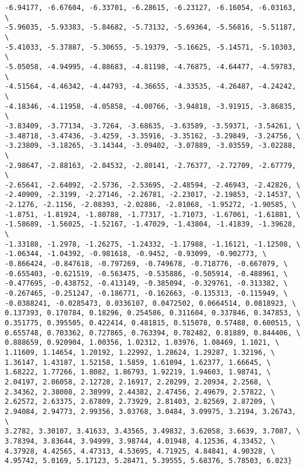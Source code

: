 \documentclass[%
  twocolumn,
 showpacs,
 showkeys,
 preprintnumbers,
 amsmath,amssymb,
 aps,
  pra,
  longbibliography,
 floatfix,
 ]{revtex4-1}
\begin{document}
{\begin{lstlisting}[backgroundcolor=\color{yellow!10},framerule=0pt,breaklines=true, frame=tb]
-6.94177, -6.67604, -6.33701, -6.28615, -6.23127, -6.16054, -6.03163, \
-5.96035, -5.93383, -5.84682, -5.73132, -5.69364, -5.56816, -5.51187, \
-5.41033, -5.37887, -5.30655, -5.19379, -5.16625, -5.14571, -5.10303, \
-5.05058, -4.94995, -4.88683, -4.81198, -4.76875, -4.64477, -4.59783, \
-4.51564, -4.46342, -4.44793, -4.36655, -4.33535, -4.26487, -4.24242, \
-4.18346, -4.11958, -4.05858, -4.00766, -3.94818, -3.91915, -3.86835, \
-3.83409, -3.77134, -3.7264, -3.68635, -3.63589, -3.59371, -3.54261, \
-3.48718, -3.47436, -3.4259, -3.35916, -3.35162, -3.29849, -3.24756, \
-3.23809, -3.18265, -3.14344, -3.09402, -3.07889, -3.03559, -3.02288, \
-2.98647, -2.88163, -2.84532, -2.80141, -2.76377, -2.72709, -2.67779, \
-2.65641, -2.64092, -2.5736, -2.53695, -2.48594, -2.46943, -2.42826, \
-2.40909, -2.3199, -2.27146, -2.26781, -2.23017, -2.19853, -2.14537, \
-2.1276, -2.1156, -2.08393, -2.02886, -2.01068, -1.95272, -1.90585, \
-1.8751, -1.81924, -1.80788, -1.77317, -1.71073, -1.67061, -1.61881, \
-1.58689, -1.56025, -1.52167, -1.47029, -1.43804, -1.41839, -1.39628, \
-1.33188, -1.2978, -1.26275, -1.24332, -1.17988, -1.16121, -1.12508, \
-1.06344, -1.04392, -0.981618, -0.9452, -0.93099, -0.902773, \
-0.866424, -0.847618, -0.797269, -0.749678, -0.718776, -0.667079, \
-0.655403, -0.621519, -0.563475, -0.535886, -0.505914, -0.488961, \
-0.477695, -0.438752, -0.413149, -0.385094, -0.329761, -0.313382, \
-0.267465, -0.251247, -0.186771, -0.162663, -0.135313, -0.115949, \
-0.0388241, -0.0285473, 0.0336107, 0.0472502, 0.0664514, 0.0818923, \
0.137393, 0.170784, 0.18296, 0.254586, 0.311604, 0.337846, 0.347853, \
0.351775, 0.395505, 0.422414, 0.481815, 0.515078, 0.57488, 0.600515, \
0.655748, 0.703362, 0.727865, 0.763394, 0.782482, 0.81889, 0.844406, \
0.888659, 0.920904, 1.00356, 1.02312, 1.03976, 1.08469, 1.1021, \
1.11609, 1.14654, 1.20192, 1.22992, 1.28624, 1.29287, 1.32196, \
1.36147, 1.43187, 1.52158, 1.5859, 1.61094, 1.62377, 1.66645, \
1.68222, 1.77266, 1.8082, 1.86793, 1.92219, 1.94603, 1.98741, \
2.04197, 2.06058, 2.12728, 2.16917, 2.20299, 2.20934, 2.2568, \
2.34362, 2.38008, 2.38999, 2.44382, 2.47456, 2.49679, 2.57822, \
2.62572, 2.63375, 2.67809, 2.73929, 2.81403, 2.82569, 2.87209, \
2.94084, 2.94773, 2.99356, 3.03768, 3.0484, 3.09975, 3.2194, 3.26743, \
3.2782, 3.30107, 3.41633, 3.43565, 3.49832, 3.62058, 3.6639, 3.7087, \
3.78394, 3.83644, 3.94999, 3.98744, 4.01948, 4.12536, 4.33452, \
4.37928, 4.42565, 4.47313, 4.53695, 4.71925, 4.84841, 4.90328, \
4.95742, 5.0169, 5.17123, 5.28471, 5.39555, 5.68376, 5.78503, 6.023}

\end{lstlisting}  }

\ifsup

 
 
\end{document}
